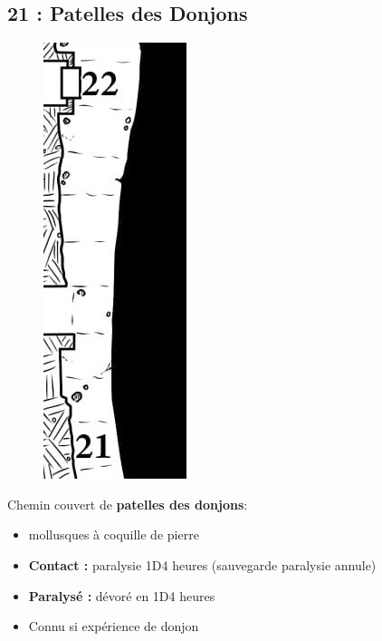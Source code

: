 \subsection{21 : Patelles des Donjons}\label{n2:s21}
\begin{figure}
  \includegraphics[width=\linewidth]{pics/map_21-22.jpg}
\end{figure}
Chemin couvert de \textbf{patelles des donjons}:
\begin{itemize}
  \item mollusques à coquille de pierre
  \item \textbf{Contact :} paralysie 1D4 heures (sauvegarde paralysie annule)
  \item \textbf{Paralysé :} dévoré en 1D4 heures
  \item Connu si expérience de donjon
\end{itemize}







